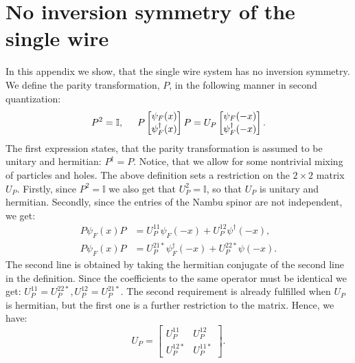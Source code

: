 
\chapter{No inversion symmetry of the single wire} %

\label{AppendixB} %
\chead{}

In this appendix we show, that the single wire system has no inversion symmetry. We define the parity transformation, $P$, in the following manner in second quantization: 
\begin{equation}
P^2 = \mathbb{I}, \hspace{0.5cm} P\begin{bmatrix} \psi_F(x) \\ \psi^\dagger_F(x) \end{bmatrix} P = U_P\begin{bmatrix} \psi_F(-x) \\ \psi^\dagger_F(-x) \end{bmatrix}.
\label{eq.definversion}
\end{equation}
The first expression states, that the parity transformation is assumed to be unitary and hermitian: $P^\dagger = P$. Notice, that we allow for some nontrivial mixing of particles and holes. The above definition sets a restriction on the $2 \times 2$ matrix $U_P$. Firstly, since $P^2 = \mathbb{I}$ we also get that $U_P^2 = \mathbb{I}$, so that $U_P$ is unitary and hermitian. Secondly, since the entries of the Nambu spinor are not independent, we get:
\begin{align}
P\psi_F(x)P &= U_P^{11} \psi_F(-x) + U_P^{12} \psi^\dagger(-x), \nonumber \\
P\psi_F(x)P &= U_P^{21*} \psi^\dagger_F(-x) + U_P^{22*} \psi(-x). \nonumber
\end{align}
The second line is obtained by taking the hermitian conjugate of the second line in the definition. Since the coefficients to the same operator must be identical we get: $U_P^{11} = U_P^{22*}, U_P^{12} = U_P^{21*}$. The second requirement is already fulfilled when $U_P$ is hermitian, but the first one is a further restriction to the matrix. Hence, we have:
\begin{equation}
U_P = \begin{bmatrix} U_P^{11} & U_P^{12} \\ U_P^{12*} & U_P^{11*}\end{bmatrix}. 
\label{eq.UP}
\end{equation}
